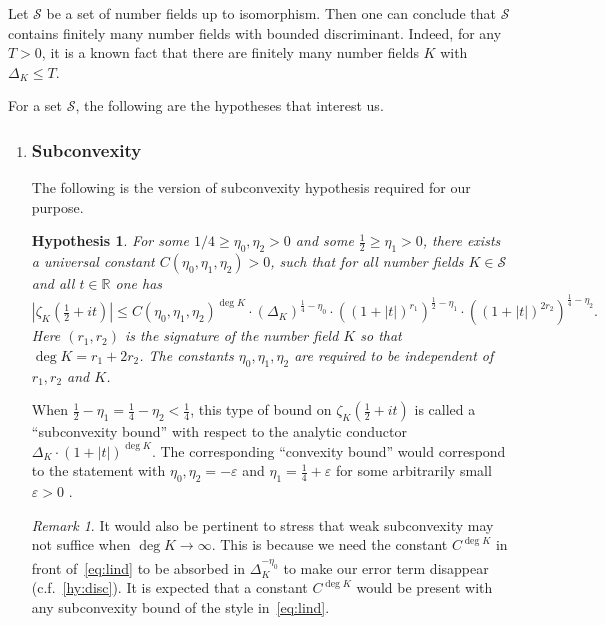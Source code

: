 \documentclass[a4paper]{article}
\newtheorem{hypothesis}[theorem]{Hypothesis}
\theoremstyle{definition}
\theoremstyle{remark}
\newtheorem{remark}[theorem]{Remark}
\begin{document}
Let $\mathcal{S}$ be a set of number fields up to isomorphism. 
Then one can conclude that $\mathcal{S}$ contains finitely many number fields with bounded discriminant. Indeed,
for any $T>0$, it is a known fact that there are finitely many number fields $K$ with $\Delta_{K} \leq T$.

For a set $\mathcal{S}$, the following are the hypotheses that interest us.
\begin{enumerate}

    \item 
\subsubsection*{Subconvexity}


The following is the version of subconvexity hypothesis required for our purpose.
\begin{hypothesis}
	\label{hy:lind}
For some $1/4 \geq \eta_{0}, \eta_{2} > 0$ and some $ \frac{1}{2}  \geq \eta_{1} > 0$, there exists a universal constant $C(\eta_{0},\eta_{1},\eta_{2}) > 0$, 
such that for all number fields $K \in \mathcal{S}$ and all $t \in \mathbb{R}$ one has
\begin{equation}
	\label{eq:lind}
    | \zeta_{K}( \tfrac{1}{2} + it)| \leq C(\eta_{0},\eta_{1},\eta_{2})^{\deg K} \cdot 
    \left( \Delta_{K} \right)^{\frac{1}{4}-\eta_{0}} \cdot
    \left( (1 + |t|)^{r_{1} }  \right)^{ \frac{1}{2}-\eta_{1}} \cdot
    \left( (1 + |t|)^{ 2 r_{2} }  \right)^{ \frac{1}{4}-\eta_{2}}.
\end{equation}
Here $(r_{1},r_{2})$ is the signature of the number field $K$ so that $\deg K = r_{1}  + 2r_{2}$. The constants $\eta_{0},\eta_{1},\eta_{2}$ are required to be independent of $r_{1},r_{2}$ and $K$.
\end{hypothesis}

When $\tfrac{1}{2}-\eta_{1}=\tfrac{1}{4}-\eta_{2} < \frac{1}{4}$, 
this type of bound on $\zeta_{K}(\tfrac{1}{2}+it)$ 
is called a ``subconvexity bound'' with respect to the analytic conductor $\Delta_{K} \cdot (1+|t|)^{\deg K}$. 
The corresponding ``convexity bound'' would correspond to the statement with $\eta_{0},\eta_{2}=- \varepsilon$ and $\eta_{1} = \tfrac{1}{4}+ \varepsilon$ for some arbitrarily small $\varepsilon > 0$
 \cite{I97}.


\begin{remark}
 It would also be pertinent to stress that weak subconvexity may not suffice when $\deg K \xrightarrow[]{} \infty$. 
 This is because we need the constant $C^{\deg K}$ in front of~\cref{eq:lind}
 to be absorbed in $\Delta_{K}^{-\eta_{0}}$ to make our error term disappear (c.f.~\cref{hy:disc}). 
 It is expected that a constant $C^{\deg K}$ would be present with any subconvexity bound of the style in~\cref{eq:lind}. 
\end{remark}


\end{enumerate}
\end{document}
